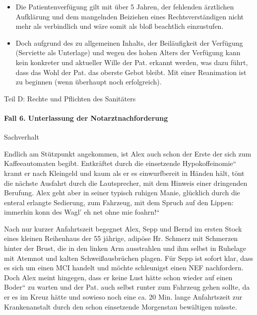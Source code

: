\documentclass{article}
\begin{document}
\begin{itemize}
\item Die Patientenverf\"ugung gilt mit \"uber 5 Jahren, der fehlenden
\"arztlichen Aufkl\"arung und dem mangelnden Beiziehen eines
Rechtsverst\"andigen nicht mehr als verbindlich und w\"are somit als
blo{\ss} beachtlich einzustufen. 

\item Doch aufgrund des zu allgemeinen Inhalts, der Beil\"aufigkeit der
Verf\"ugung (Serviette als Unterlage) und wegen des hohen Alters der
Verf\"ugung kann kein konkreter und aktueller Wille der Pat. erkannt
werden, was dazu f\"uhrt, dass das Wohl der Pat. das oberste Gebot
bleibt. Mit einer Reanimation ist zu beginnen (wenn \"uberhaupt noch
erfolgreich).

\end{itemize}
Teil D: Rechte und Pflichten des Sanit\"aters

\paragraph{Fall 6. Unterlassung der Notarztnachforderung}
Sachverhalt

Endlich am St\"utzpunkt angekommen, ist Alex auch schon der Erste der
sich zum Kaffeeautomaten begibt. Entkr\"aftet durch die einsetzende
{\quotedblbase}Hypokoffeinomie{\textquotedblleft} kramt er nach
Kleingeld und kaum als er es einwurfbereit in H\"anden h\"alt, t\"ont
die n\"achste Ausfahrt durch die Lautsprecher, mit dem Hinweis einer
dringenden Berufung. Alex geht aber in seiner typisch ruhigen Manie,
gl\"ucklich durch die enteral erlangte Sedierung, zum Fahrzeug, mit dem
Spruch auf den Lippen: {\quotedblbase}immerhin konn des
Wagl{\textquoteright} eh net ohne mie foahrn!{\textquotedblleft}

Nach nur kurzer Anfahrtszeit begegnet Alex, Sepp und Bernd im ersten
Stock eines kleinen Reihenhaus der 55 j\"ahrige, adip\"ose Hr. Schmerz
mit Schmerzen hinter der Brust, die in den linken Arm ausstrahlen und
ihm selbst in Ruhelage mit Atemnot und kalten Schwei{\ss}ausbr\"uchen
plagen. F\"ur Sepp ist sofort klar, dass es sich um einen MCI handelt
und m\"ochte schleunigst einen NEF nachfordern. Doch Alex meint
hingegen, dass er keine Lust h\"atte schon wieder auf einen
{\quotedblbase}Boder{\textquotedblleft} zu warten und der Pat. auch
selbst runter zum Fahrzeug gehen sollte, da er es im Kreuz h\"atte und
sowieso noch eine ca. 20 Min. lange Anfahrtszeit zur Krankenanstalt
durch den schon einsetzende Morgenstau bew\"altigen m\"usste.
\end{document}
